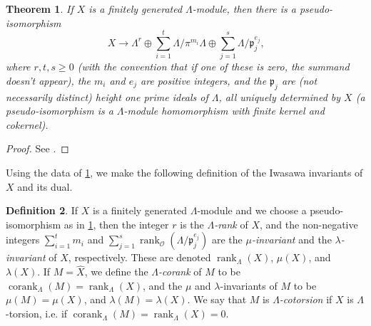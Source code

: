 \documentclass[12 pt]{amsart}
\theoremstyle{plain}
\newtheorem{thm}{Theorem}[section]
\theoremstyle{definition}
\newtheorem{defn}[thm]{Definition}
\numberwithin{equation}{section}
\numberwithin{table}{section}
\begin{document}
\begin{thm}
\label{lambda-structure-thm}
If $X$ is a finitely generated $\Lambda$-module, then there is a pseudo-isomorphism
\begin{equation*}
X\to\Lambda^r\oplus\sum_{i=1}^t\Lambda/\pi^{m_i}\Lambda\oplus\sum_{j=1}^s\Lambda/\mathfrak{p}_j^{e_j}\text{,}
\end{equation*}
where $r,t,s\geq 0$ (with the convention that if one of these is zero, the summand doesn't appear), the $m_i$ and $e_j$ are positive integers, and the $\mathfrak{p}_j$ are (not necessarily distinct) height one prime ideals of $\Lambda$, all uniquely determined by $X$ (a pseudo-isomorphism is a $\Lambda$-module homomorphism with finite kernel and cokernel). 
\end{thm}
\begin{proof}
See \cite[5.3.8]{NSW}.
\end{proof}
Using the data of \cref{lambda-structure-thm}, we make the following definition of the Iwasawa invariants of $X$ and its dual.
\begin{defn}
\label{iwasawa-inv-defn}
If $X$ is a finitely generated $\Lambda$-module and we choose a pseudo-isomorphism as in \cref{lambda-structure-thm}, then the integer $r$ is the \emph{$\Lambda$-rank} of $X$, and the non-negative integers $\sum_{i=1}^t m_i$ and $\sum_{j=1}^s \operatorname{rank}_\mathscr{O}(\Lambda/\mathfrak{p}_j^{e_j})$ are the \emph{$\mu$-invariant} and the \emph{$\lambda$-invariant} of $X$, respectively. These are denoted $\operatorname{rank}_\Lambda(X)$, $\mu(X)$, and $\lambda(X)$. If $M=\widehat{X}$, we define the \emph{$\Lambda$-corank} of $M$ to be $\operatorname{corank}_\Lambda(M)=\operatorname{rank}_\Lambda(X)$, and the $\mu$ and $\lambda$-invariants of $M$ to be $\mu(M)=\mu(X)$, and $\lambda(M)=\lambda(X)$. We say that $M$ is \emph{$\Lambda$-cotorsion} if $X$ is $\Lambda$-torsion, i.e. if $\operatorname{corank}_\Lambda(M)=\operatorname{rank}_\Lambda(X)=0$.
\end{defn}
\end{document}
